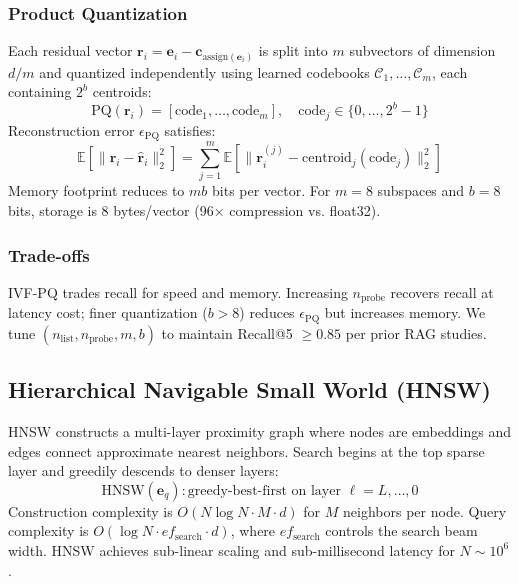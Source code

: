 \documentclass[conference]{IEEEtran}
\begin{document}
\subsubsection{Product Quantization}
Each residual vector $\mathbf{r}_i = \mathbf{e}_i - \mathbf{c}_{\mathrm{assign}(\mathbf{e}_i)}$ is split into $m$ subvectors of dimension $d/m$ and quantized independently using learned codebooks $\mathcal{C}_1, \ldots, \mathcal{C}_m$, each containing $2^b$ centroids:
\begin{equation}
\mathrm{PQ}(\mathbf{r}_i) = [\mathrm{code}_1, \ldots, \mathrm{code}_m], \quad \mathrm{code}_j \in \{0, \ldots, 2^b{-}1\}
\label{eq:pq}
\end{equation}
Reconstruction error $\epsilon_{\mathrm{PQ}}$ satisfies:
\begin{equation}
\mathbb{E}[\|\mathbf{r}_i - \hat{\mathbf{r}}_i\|_2^2] = \sum_{j=1}^{m} \mathbb{E}[\|\mathbf{r}_i^{(j)} - \mathrm{centroid}_j(\mathrm{code}_j)\|_2^2]
\label{eq:pq_error}
\end{equation}
Memory footprint reduces to $mb$ bits per vector. For $m{=}8$ subspaces and $b{=}8$ bits, storage is 8 bytes/vector (96$\times$ compression vs. float32).

\subsubsection{Trade-offs}
IVF-PQ trades recall for speed and memory. Increasing $n_{\mathrm{probe}}$ recovers recall at latency cost; finer quantization ($b > 8$) reduces $\epsilon_{\mathrm{PQ}}$ but increases memory. We tune $(n_{\mathrm{list}}, n_{\mathrm{probe}}, m, b)$ to maintain Recall@5 $\geq 0.85$ per prior RAG studies.

\subsection{Hierarchical Navigable Small World (HNSW)}

HNSW constructs a multi-layer proximity graph where nodes are embeddings and edges connect approximate nearest neighbors. Search begins at the top sparse layer and greedily descends to denser layers:
\begin{equation}
\mathrm{HNSW}(\mathbf{e}_q) : \text{greedy-best-first on layer } \ell = L, \ldots, 0
\label{eq:hnsw}
\end{equation}
Construction complexity is $O(N \log N \cdot M \cdot d)$ for $M$ neighbors per node. Query complexity is $O(\log N \cdot ef_{\mathrm{search}} \cdot d)$, where $ef_{\mathrm{search}}$ controls the search beam width. HNSW achieves sub-linear scaling and sub-millisecond latency for $N \sim 10^6$.
\end{document}
